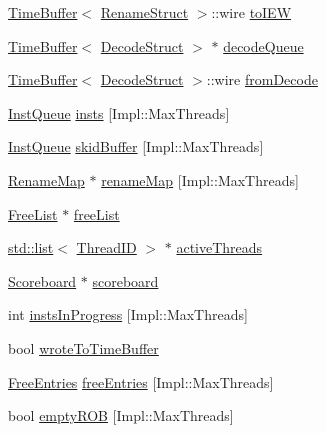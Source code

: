 \begin{DoxyCompactItemize}
\item 
\hyperlink{classTimeBuffer}{TimeBuffer}$<$ \hyperlink{classDefaultRename_a0c2a89ad2edad9ad605d0461f9b132a5}{RenameStruct} $>$::wire \hyperlink{classDefaultRename_a20add800a4fdb85a3d370265f248a006}{toIEW}
\item 
\hyperlink{classTimeBuffer}{TimeBuffer}$<$ \hyperlink{classDefaultRename_a38077cd156cf219016abf92d8c5b523b}{DecodeStruct} $>$ $\ast$ \hyperlink{classDefaultRename_a7860fc5736574343c9e294cb2bef9d93}{decodeQueue}
\item 
\hyperlink{classTimeBuffer}{TimeBuffer}$<$ \hyperlink{classDefaultRename_a38077cd156cf219016abf92d8c5b523b}{DecodeStruct} $>$::wire \hyperlink{classDefaultRename_a8bf861a7b2c3731d3a69bf370564e975}{fromDecode}
\item 
\hyperlink{classstd_1_1list}{InstQueue} \hyperlink{classDefaultRename_a4b6cd9f78efe8b5101b48dbf35a43c11}{insts} \mbox{[}Impl::MaxThreads\mbox{]}
\item 
\hyperlink{classstd_1_1list}{InstQueue} \hyperlink{classDefaultRename_a64b861e400ea5adcf7a2f2dbe605e221}{skidBuffer} \mbox{[}Impl::MaxThreads\mbox{]}
\item 
\hyperlink{classDefaultRename_a341963bcea1928476182a17e357f98e3}{RenameMap} $\ast$ \hyperlink{classDefaultRename_ac305c101c17d28451cc1f023b187b08b}{renameMap} \mbox{[}Impl::MaxThreads\mbox{]}
\item 
\hyperlink{classDefaultRename_ab784c356bacd490590fba42443e0f786}{FreeList} $\ast$ \hyperlink{classDefaultRename_a2e829c52dbc56e7ac6d2fc6a0524ff9c}{freeList}
\item 
\hyperlink{classstd_1_1list}{std::list}$<$ \hyperlink{base_2types_8hh_ab39b1a4f9dad884694c7a74ed69e6a6b}{ThreadID} $>$ $\ast$ \hyperlink{classDefaultRename_af6eaea53db532812052f71bf0380dab5}{activeThreads}
\item 
\hyperlink{classScoreboard}{Scoreboard} $\ast$ \hyperlink{classDefaultRename_a265ad15229da2a6a05f908da093b3ed5}{scoreboard}
\item 
int \hyperlink{classDefaultRename_af301c62fee41266f36b1318688c8aa55}{instsInProgress} \mbox{[}Impl::MaxThreads\mbox{]}
\item 
bool \hyperlink{classDefaultRename_a2c7e870d4babdac0dc91fc7ffabd0f3d}{wroteToTimeBuffer}
\item 
\hyperlink{structDefaultRename_1_1FreeEntries}{FreeEntries} \hyperlink{classDefaultRename_a20d0243bc02977001bfbd4834a7d8b5d}{freeEntries} \mbox{[}Impl::MaxThreads\mbox{]}
\item 
bool \hyperlink{classDefaultRename_a5a3345554ca63a6e859943d7174d714f}{emptyROB} \mbox{[}Impl::MaxThreads\mbox{]}

\end{DoxyCompactItemize}
